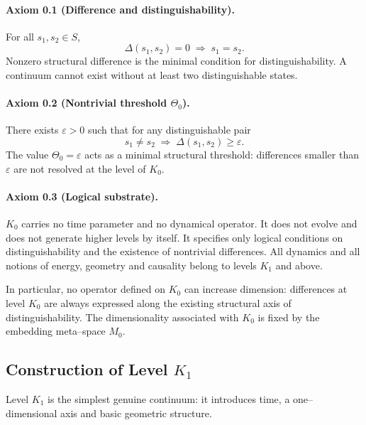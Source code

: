 \paragraph{Axiom 0.1 (Difference and distinguishability).}
For all \(s_1,s_2 \in S\),
\[
    \Delta(s_1,s_2) = 0 \;\Rightarrow\; s_1 = s_2.
\]
Nonzero structural difference is the minimal condition for distinguishability.
A continuum cannot exist without at least two distinguishable states.

\paragraph{Axiom 0.2 (Nontrivial threshold \texorpdfstring{$\Theta_0$}{Theta0}).}
There exists \(\varepsilon > 0\) such that for any distinguishable pair
\[
    s_1 \neq s_2 \;\Rightarrow\; \Delta(s_1,s_2) \ge \varepsilon.
\]
The value \(\Theta_0 = \varepsilon\) acts as a minimal structural threshold: differences smaller than \(\varepsilon\) are not resolved at the level of \(K_0\).

\paragraph{Axiom 0.3 (Logical substrate).}
\(K_0\) carries no time parameter and no dynamical operator.
It does not evolve and does not generate higher levels by itself.
It specifies only logical conditions on distinguishability and the existence of nontrivial differences.
All dynamics and all notions of energy, geometry and causality belong to levels \(K_1\) and above.

In particular, no operator defined on \(K_0\) can increase dimension:
differences at level \(K_0\) are always expressed along the existing structural axis of distinguishability.
The dimensionality associated with \(K_0\) is fixed by the embedding meta–space \(M_0\).

\subsection{Construction of Level \texorpdfstring{$K_1$}{K1}}

Level \(K_1\) is the simplest genuine continuum: it introduces time, a one–dimensional axis and basic geometric structure.

